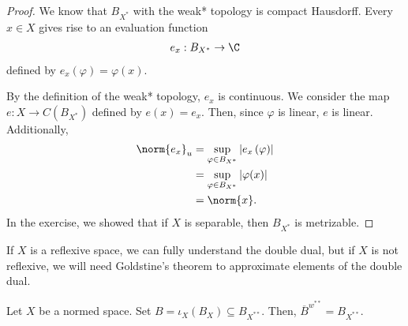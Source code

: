 \documentclass[10pt]{mypackage}
\begin{document}
\begin{proof}
  We know that $B_{X^{\ast}}$ with the weak* topology is compact Hausdorff. Every $x\in X$ gives rise to an evaluation function
  \begin{align*}
    e_x: B_{X^{\ast}}\rightarrow \C
  \end{align*}
  defined by $e_x\left(\varphi\right) = \varphi\left(x\right)$.\newline

  By the definition of the weak* topology, $e_x$ is continuous. We consider the map $e: X\rightarrow C\left(B_{X^{\ast}}\right)$ defined by $e(x) = e_x$. Then, since $\varphi $ is linear, $e$ is linear. Additionally,
\begin{align*}
  \norm{e_x}_{u} &= \sup_{\varphi\in B_{X^{\ast}}}\left\vert e_x\left(\varphi\right) \right\vert\\
                 &= \sup_{\varphi\in B_{X^{\ast}}} \left\vert \varphi(x) \right\vert\\
                 &= \norm{x}.
\end{align*}
In the exercise, we showed that if $X$ is separable, then $B_{X^{\ast}}$ is metrizable.
\end{proof}
If $X$ is a reflexive space, we can fully understand the double dual, but if $X$ is not reflexive, we will need Goldstine's theorem to approximate elements of the double dual.
\begin{theorem}
  Let $X$ be a normed space. Set $B = \iota_{X}\left(B_X\right)\subseteq B_{X^{\ast\ast}}$. Then, $\overline{B}^{w^{\ast\ast}} = B_{X^{\ast\ast}}$.
\end{theorem}
\end{document}
